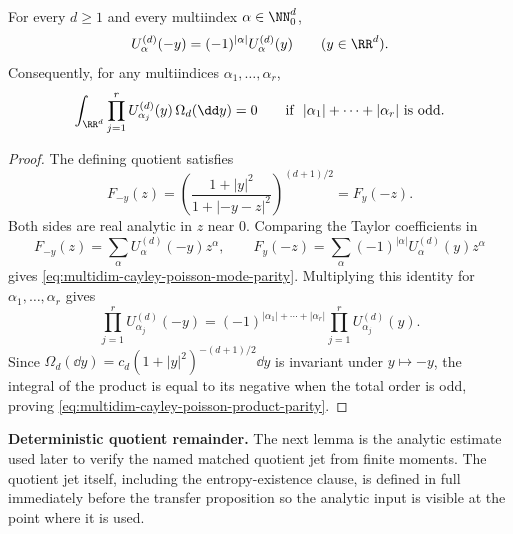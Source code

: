 \begin{lemma}%
\label{lem:multidim-cayley-poisson-mode-parity}
For every \(d\ge1\) and every multiindex \(\alpha\in\NN_0^d\),
\begin{equation}\label{eq:multidim-cayley-poisson-mode-parity}
U_\alpha^{(d)}(-y)=(-1)^{|\alpha|}U_\alpha^{(d)}(y)
\qquad(y\in\RR^d).
\end{equation}
Consequently, for any multiindices
\(\alpha_1,\ldots,\alpha_r\),
\begin{equation}\label{eq:multidim-cayley-poisson-product-parity}
\int_{\RR^d}\prod_{j=1}^r
U_{\alpha_j}^{(d)}(y)\,\Omega_d(\dd y)=0
\qquad\text{if }\ |\alpha_1|+\cdots+|\alpha_r|\text{ is odd}.
\end{equation}
\end{lemma}

\begin{proof}
The defining quotient satisfies
\[
F_{-y}(z)
=\left(\frac{1+|y|^2}{1+|-y-z|^2}\right)^{(d+1)/2}
=F_y(-z).
\]
Both sides are real analytic in \(z\) near \(0\).  Comparing the Taylor
coefficients in
\[
F_{-y}(z)=\sum_{\alpha}U_\alpha^{(d)}(-y)z^\alpha,
\qquad
F_y(-z)=\sum_{\alpha}(-1)^{|\alpha|}U_\alpha^{(d)}(y)z^\alpha
\]
gives \eqref{eq:multidim-cayley-poisson-mode-parity}.  Multiplying this
identity for \(\alpha_1,\ldots,\alpha_r\) gives
\[
\prod_{j=1}^r U_{\alpha_j}^{(d)}(-y)
=(-1)^{|\alpha_1|+\cdots+|\alpha_r|}
\prod_{j=1}^r U_{\alpha_j}^{(d)}(y).
\]
Since \(\Omega_d(\dd y)=c_d(1+|y|^2)^{-(d+1)/2}\dd y\) is invariant under
\(y\mapsto-y\), the integral of the product is equal to its negative when
the total order is odd, proving
\eqref{eq:multidim-cayley-poisson-product-parity}.
\end{proof}

\medskip
\noindent\textbf{Deterministic quotient remainder.}
The next lemma is the analytic estimate used later to verify the named
matched quotient jet from finite moments.  The quotient jet itself, including
the entropy-existence clause, is defined in full immediately before the
transfer proposition so the analytic input is visible at the point where it is
used.

